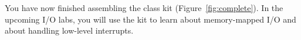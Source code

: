     You have now finished assembling the class kit (Figure~\ref{fig:complete}).
    In the upcoming I/O labs, you will use the kit to learn about memory-mapped I/O and about handling low-level interrupts.

\begin{figure}
    \centering
\end{figure}
